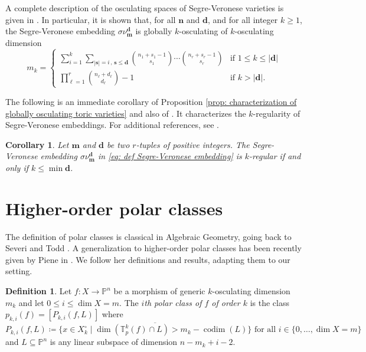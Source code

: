 \documentclass[11pt,reqno]{amsart}
\numberwithin{equation}{section}
\theoremstyle{plain}
\numberwithin{theorem}{section}
\newtheorem{corollary}[theorem]{Corollary}
\theoremstyle{definition}
\newtheorem{definition}[theorem]{Definition}
\renewcommand{\P}{\mathbb{P}}
\newcommand{\T}{\mathbb{T}}
\def\bd{{\boldsymbol{d}}}
\def\bm{{\boldsymbol{m}}}
\def\bn{{\boldsymbol{n}}}
\def\bs{{\boldsymbol{s}}}
\newcommand{\codim}{\operatorname{codim}}
\begin{document}
A complete description of the osculating spaces of Segre-Veronese varieties is given in \cite[Proposition 2.5]{araujo2019defectivity}.
In particular, it is shown that, for all $\bn$ and $\bd$, and for all integer $k\ge 1$, the Segre-Veronese embedding $\sigma\nu_\bm^\bd$ is globally $k$-osculating of $k$-osculating dimension
\begin{equation}\label{eq: osculating dimension SV}
    m_k = 
    \begin{cases}
        \sum_{i=1}^k\sum_{|\bs|=i\,,\,\bs\le\bd}\binom{n_1+s_1-1}{s_1}\cdots\binom{n_r+s_r-1}{s_r} & \text{if $1\le k\le |\bd|$}\\
        \prod_{\ell=1}^r\binom{n_\ell+d_\ell}{d_\ell}-1 & \text{if $k>|\bd|$.}
    \end{cases}
\end{equation}

The following is an immediate corollary of Proposition \ref{prop: characterization of globally osculating toric varieties} and also of \cite[Theorem 4.2, Proposition 4.5]{dirocco1999generation}. It characterizes the $k$-regularity of Segre-Veronese embeddings. For additional references, see \cite{massarenti2019defectivity,catalisano2002secant,bernardi2007osculating,ballico2003secant}.
\begin{corollary}\label{corol: when Segre-Veronese k-regular}
Let $\bm$ and $\bd$ be two $r$-tuples of positive integers. The Segre-Veronese embedding $\sigma\nu_\bm^\bd$ in \eqref{eq: def Segre-Veronese embedding} is $k$-regular if and only if $k\le\min\bd$. 
\end{corollary}














\section{Higher-order polar classes}\label{sec: polar}

The definition of polar classes is classical in Algebraic Geometry, going back to Severi \cite{severi1902intersezioni} and Todd \cite{todd1937arithmetical}.
A generalization to higher-order polar classes has been recently given by Piene in \cite{piene2022higher}. We follow her definitions and results, adapting them to our setting.

\begin{definition}{\cite[Section 3]{piene2022higher}}\label{def: kth order polar classes}
Let $f\colon X\to\P^n$ be a morphism of generic $k$-osculating dimension $m_k$ and let $0\le i\le \dim X=m.$ The {\em $i$th polar class of $f$ of order $k$} is the class $p_{k,i}(f)=[P_{k,i}(f,L)]$ where
\begin{equation}\label{eq: def higher-order polar loci}
\text{$P_{k,i}(f,L)\coloneqq\overline{\{x\in X_k^{\circ}\mid\dim(\T_p^k(f)\cap L)>m_k-\codim(L)\}}$ for all $i\in\{0,\dots,\dim X=m\}$}\end{equation}
and $L\subseteq\P^n$ is any linear subspace of dimension $n-m_k+i-2.$
\end{definition}
\end{document}
